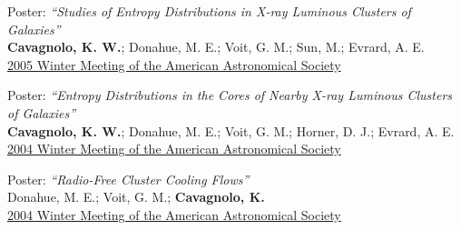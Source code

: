 \documentclass[11pt]{cv}
\begin{document}
\begin{llist}
{\sc Poster: {\textit{``Studies of Entropy Distributions in X-ray Luminous Clusters of Galaxies''}}}\\
{\bf Cavagnolo, K. W.}; Donahue, M. E.; Voit, G. M.; Sun, M.; Evrard, A. E.\\
\href{http://adsabs.harvard.edu/abs/2005AAS...20713903C}{2005 Winter
Meeting of the American Astronomical Society}

{\sc Poster: {\textit{``Entropy Distributions in the Cores of Nearby X-ray Luminous Clusters of Galaxies''}}}\\
{\bf Cavagnolo, K. W.}; Donahue, M. E.; Voit, G. M.; Horner, D. J.; Evrard, A. E.\\
\href{http://adsabs.harvard.edu/abs/2004AAS...20514715C}{2004 Winter
Meeting of the American Astronomical Society}

{\sc Poster: {\textit{``Radio-Free Cluster Cooling Flows''}}}\\
Donahue, M. E.; Voit, G. M.; {\bf Cavagnolo, K.}\\
\href{http://adsabs.harvard.edu/abs/2004AAS...205.6020D}{2004 Winter
Meeting of the American Astronomical Society}



\end{llist}
\end{document}
